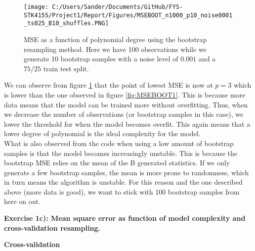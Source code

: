 \documentclass[12pt,a4paper]{article}
\begin{document}
\begin{figure}[H]
\centering
\texttt{[image: C:/Users/Sander/Documents/GitHub/FYS-STK4155/Project1/Report/Figures/MSEBOOT\_n1000\_p10\_noise0001\_ts025\_B10\_shuffles.PNG]}
\caption{\label{fig:MSEBOOT2} MSE as a function of polynomial degree using the bootstrap resampling method. Here we have 100 observations while we generate 10 bootstrap samples with a noise level of $0.001$ and a $75/25$ train test split.}
\end{figure}

\noindent We can observe from figure \ref{fig:MSEBOOT2} that the point of lowest MSE is now at $p = 3$ which is lower than the one observed in figure \ref{fig:MSEBOOT1}. This is because more data means that the model can be trained more without overfitting. Thus, when we decrease the number of observations (or bootstrap samples in this case), we lower the threshold for when the model becomes overfit. This again means that a lower degree of polynomial is the ideal complexity for the model. 
\\
What is also observed from the code when using a low amount of bootstrap samples is that the model becomes increasingly unstable. This is because the bootstrap MSE relies on the mean of the B generated statistics. If we only generate a few bootstrap samples, the mean is more prone to randomness, which in turn means the algorithm is unstable. For this reason and the one described above (more data is good), we want to stick with 100 bootstrap samples from here on out.

\newpage

\begin{center}
\large{\textbf{Exercise 1c): Mean square error as function of model complexity and cross-validation resampling.}}
\end{center}

\begin{center}
\large{\textbf{Cross-validation}}
\end{center}
\end{document}
